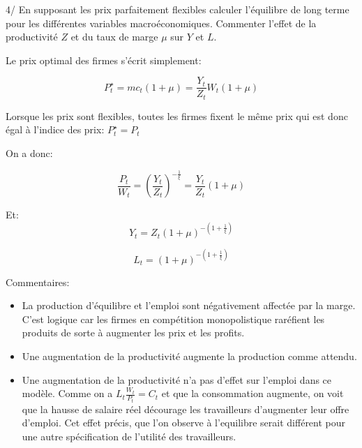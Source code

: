 \documentclass[
  letterpaper,
  DIV=11,
  numbers=noendperiod]{scrartcl}
\begin{document}
4/ En supposant les prix parfaitement flexibles calculer l'équilibre de
long terme pour les différentes variables macroéconomiques. Commenter
l'effet de la productivité \(Z\) et du taux de marge \(\mu\) sur \(Y\)
et \(L\).

\begin{tcolorbox}[enhanced jigsaw, colbacktitle=quarto-callout-warning-color!10!white, rightrule=.15mm, left=2mm, leftrule=.75mm, colframe=quarto-callout-warning-color-frame, titlerule=0mm, colback=white, toptitle=1mm, bottomtitle=1mm, breakable, coltitle=black, title=\textcolor{quarto-callout-warning-color}{\faExclamationTriangle}\hspace{0.5em}{Correction}, bottomrule=.15mm, opacityback=0, arc=.35mm, toprule=.15mm, opacitybacktitle=0.6]

Le prix optimal des firmes s'écrit simplement:

\[P^{\star}_t = mc_t (1+\mu) = \frac{Y_t}{Z_t} W_t (1+\mu)\]

Lorsque les prix sont flexibles, toutes les firmes fixent le même prix
qui est donc égal à l'indice des prix: \(P^{\star}_t = P_t\)

On a donc:

\[\frac{P_t}{W_t} = \left( \frac{Y_t}{Z_t} \right)^{-\frac{1}{\xi}} = \frac{Y_t}{Z_t} (1+\mu)\]

Et: \[Y_t = Z_t (1+\mu)^{-(1+\frac{1}{\xi})}\]

\[L_t = (1+\mu)^{-(1+\frac{1}{\xi})}\]

Commentaires:

\begin{itemize}
\item
  La production d'équilibre et l'emploi sont négativement affectée par
  la marge. C'est logique car les firmes en compétition monopolistique
  raréfient les produits de sorte à augmenter les prix et les profits.
\item
  Une augmentation de la productivité augmente la production comme
  attendu.
\item
  Une augmentation de la productivité n'a pas d'effet sur l'emploi dans
  ce modèle. Comme on a \(L_t \frac{W_t}{P_t} = C_t\) et que la
  consommation augmente, on voit que la hausse de salaire réel décourage
  les travailleurs d'augmenter leur offre d'emploi. Cet effet précis,
  que l'on observe à l'equilibre serait différent pour une autre
  spécification de l'utilité des travailleurs.
\end{itemize}

\end{tcolorbox}
\end{document}
